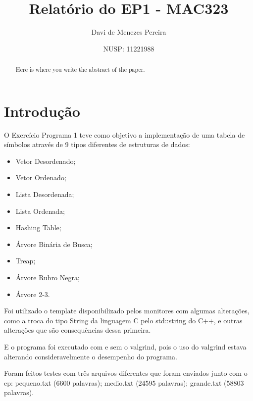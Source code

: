 \documentclass{article}
\title{Relatório do EP1 - MAC323}
\author{Davi de Menezes Pereira}
\date{NUSP: 11221988}
\begin{document}
\maketitle

\begin{abstract}

Here is where you write the abstract of the paper.

\end{abstract}

\section{Introdução}

\begin{itemize}
  \space O Exercício Programa 1 teve como objetivo a implementação de uma tabela de 
símbolos através de 9 tipos diferentes de estruturas de dados: 
\end{itemize}
    
\begin{itemize}

\item Vetor Desordenado;
\item Vetor Ordenado;
\item Lista Desordenada;
\item Lista Ordenada;
\item Hashing Table;
\item Árvore Binária de Busca;
\item Treap;
\item Árvore Rubro Negra;
\item Árvore 2-3.

\end{itemize}

\begin{itemize}
Foi utilizado o template disponibilizado pelos monitores com algumas alterações, como a troca do tipo String da linguagem C pelo std::string do C++, e outras alterações que são consequências dessa primeira.
\end{itemize}
\begin{itemize}
E o programa foi executado com e sem o valgrind, pois o uso do valgrind estava alterando consideravelmente o desempenho do programa.
\end{itemize}
\begin{itemize}
Foram feitos testes com três arquivos diferentes que foram enviados junto com o ep: pequeno.txt (6600 palavras); medio.txt (24595 palavras); grande.txt (58803 palavras).

\end{itemize}
\end{document}
